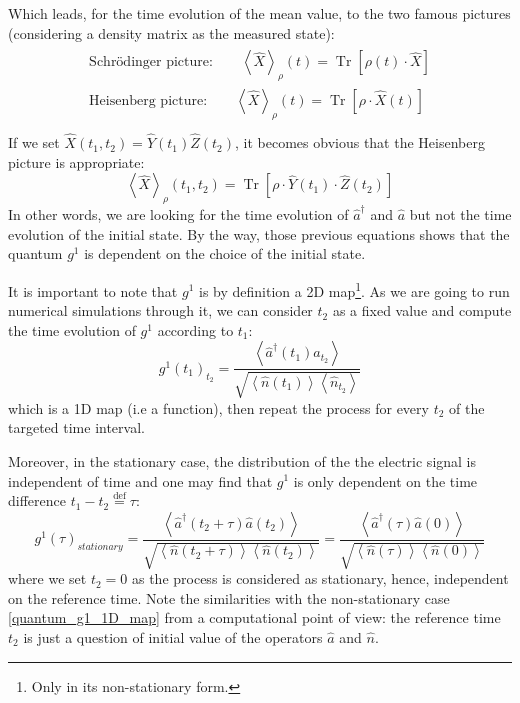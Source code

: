 \documentclass[11pt]{report}
\DeclareMathOperator{\Tr}{Tr}
\begin{document}
Which leads, for the time evolution of the mean value, to the two famous pictures (considering a density matrix as the measured state):
\begin{align}
\begin{split}
\textrm{Schrödinger picture:} \quad\quad \left\langle \hat{X} \right\rangle_{\rho} (t) = \Tr \left[ \rho(t)\cdot \hat{X} \right]\\
\textrm{Heisenberg picture:} \quad\quad \left\langle \hat{X} \right\rangle_{\rho} (t) = \Tr \left[ \rho\cdot \hat{X}(t) \right]\\
\end{split}
\end{align}
If we set $\hat{X}(t_1,t_2) = \hat{Y}(t_1)\hat{Z}(t_2)$, it becomes obvious that the Heisenberg picture is appropriate:
\begin{equation}
\left\langle \hat{X} \right\rangle _{\rho} (t_1, t_2) = \Tr \left[ \rho \cdot \hat{Y}(t_1) \cdot \hat{Z}(t_2)\right]
\end{equation} 
In other words, we are looking for the time evolution of $\hat{a}^\dagger$ and $\hat{a}$ but not the time evolution of the initial state. By the way, those previous equations shows that the quantum $g^1$ is dependent on the choice of the initial state.

It is important to note that $g^1$ is by definition a 2D map\footnote{Only in its non-stationary form.}. As we are going to run numerical simulations through it, we can consider $t_2$ as a fixed value and compute the time evolution of $g^1$ according to $t_1$:
\begin{equation}
\label{quantum_g1_1D_map}
g^1(t_1)_{t_2} = \frac{\left\langle \hat{a}^\dagger(t_1)\hat{a}_{t_2} \right\rangle}{\sqrt{\left\langle \hat{n}(t_1) \right\rangle \left\langle \hat{n}_{t_2} \right\rangle}}
\end{equation}
which is a 1D map (i.e a function), then repeat the process for every $t_2$ of the targeted time interval.

Moreover, in the stationary case, the distribution of the the electric signal is independent of time and one may find that $g^1$ is only dependent on the time difference $t_1 - t_2 \stackrel{\text{def}}{=} \tau$:
\begin{equation}
g^1(\tau)_{stationary} = \frac{\left\langle \hat{a}^\dagger(t_2 + \tau)\hat{a}(t_2) \right\rangle}{\sqrt{\left\langle \hat{n}(t_2 + \tau) \right\rangle \left\langle \hat{n}(t_2) \right\rangle}}=\frac{\left\langle \hat{a}^\dagger(\tau)\hat{a}(0) \right\rangle}{\sqrt{\left\langle \hat{n}(\tau) \right\rangle \left\langle \hat{n}(0) \right\rangle}}
\end{equation}
where we set $t_2 = 0$ as the process is considered as stationary, hence, independent on the reference time. Note the similarities with the non-stationary case \eqref{quantum_g1_1D_map} from a computational point of view: the reference time $t_2$ is just a question of initial value of the operators $\hat{a}$ and $\hat{n}$.
\end{document}
